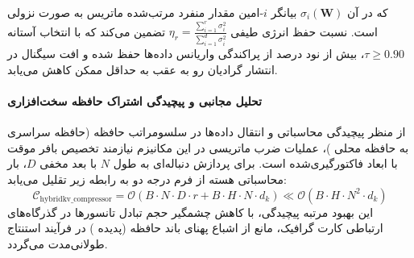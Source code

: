 که در آن $\sigma_i(\mathbf{W})$ بیانگر $i$-امین مقدار منفرد مرتب‌شده ماتریس به صورت نزولی است. نسبت حفظ انرژی طیفی $\eta_r = \frac{\sum_{i=1}^r \sigma_i^2}{\sum_{i=1}^{d} \sigma_i^2}$ تضمین می‌کند که با انتخاب آستانه $\tau \ge 0.90$، بیش از نود درصد از پراکندگی واریانس داده‌ها حفظ شده و افت سیگنال در انتشار گرادیان رو به عقب به حداقل ممکن کاهش می‌یابد.

\paragraph{تحلیل مجانبی و پیچیدگی اشتراک حافظه سخت‌افزاری}
از منظر پیچیدگی محاسباتی و انتقال داده‌ها در سلسومراتب حافظه (حافظه سراسری  به حافظه محلی )، عملیات ضرب ماتریسی در این مکانیزم نیازمند تخصیص بافر موقت با ابعاد فاکتورگیری‌شده است. برای پردازش دنباله‌ای به طول $N$ با بعد مخفی $D$، بار محاسباتی هسته از فرم درجه دو به رابطه زیر تقلیل می‌یابد:
\begin{equation}
\label{eq:complexity_hybridkv_compressor}
\mathcal{C}_{\text{hybridkv\_compressor}} = \mathcal{O}\left( B \cdot N \cdot D \cdot r + B \cdot H \cdot N \cdot d_k \right) \ll \mathcal{O}\left( B \cdot H \cdot N^2 \cdot d_k \right)
\end{equation}
این بهبود مرتبه پیچیدگی، با کاهش چشمگیر حجم تبادل تانسورها در گذرگاه‌های ارتباطی کارت گرافیک، مانع از اشباع پهنای باند حافظه (پدیده ) در فرآیند استنتاج طولانی‌مدت می‌گردد.
